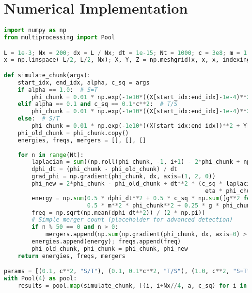 \documentclass{article}
\begin{document}
\section{Numerical Implementation}
\begin{lstlisting}[language=Python, caption=Ehokolon Consciousness Simulation, label=lst:consciousness]
import numpy as np
from multiprocessing import Pool

L = 1e-3; Nx = 200; dx = L / Nx; dt = 1e-15; Nt = 1000; c = 3e8; m = 1.0; g = 0.1; eta = 0.01; k = 0.01
x = np.linspace(-L/2, L/2, Nx); X, Y, Z = np.meshgrid(x, x, x, indexing='ij')

def simulate_chunk(args):
    start_idx, end_idx, alpha, c_sq = args
    if alpha == 1.0:  # S=T
        phi_chunk = 0.01 * np.exp(-1e10*((X[start_idx:end_idx]-1e-4)**2 + Y[start_idx:end_idx]**2 + Z[start_idx:end_idx]**2)) * np.cos(1e12 * X[start_idx:end_idx])
    elif alpha == 0.1 and c_sq == 0.1*c**2:  # T/S
        phi_chunk = 0.01 * np.exp(-1e10*((X[start_idx:end_idx]-1e-4)**2 + Y[start_idx:end_idx]**2 + Z[start_idx:end_idx]**2)) * np.cos(1e10 * X[start_idx:end_idx])
    else:  # S/T
        phi_chunk = 0.01 * np.exp(-1e10*((X[start_idx:end_idx])**2 + Y[start_idx:end_idx]**2 + Z[start_idx:end_idx]**2))
    phi_old_chunk = phi_chunk.copy()
    energies, freqs, mergers = [], [], []
    
    for n in range(Nt):
        laplacian = sum((np.roll(phi_chunk, -1, i+1) - 2*phi_chunk + np.roll(phi_chunk, 1, i+1)) / dx**2 for i in range(2))
        dphi_dt = (phi_chunk - phi_old_chunk) / dt
        grad_phi = np.gradient(phi_chunk, dx, axis=(1, 2, 0))
        phi_new = 2*phi_chunk - phi_old_chunk + dt**2 * (c_sq * laplacian - m**2 * phi_chunk - g * phi_chunk**3 - 
                                                          eta * phi_chunk**5 + 8 * np.pi * 6.674e-11 * k * phi_chunk**2)
        energy = np.sum(0.5 * dphi_dt**2 + 0.5 * c_sq * np.sum([g**2 for g in grad_phi], 0) + 
                        0.5 * m**2 * phi_chunk**2 + 0.25 * g * phi_chunk**4 + 0.1667 * eta * phi_chunk**6) * dx**3
        freq = np.sqrt(np.mean(dphi_dt**2)) / (2 * np.pi))
        # Simple merger count (placeholder for advanced detection)
        if n % 50 == 0 and n > 0:
            mergers.append(np.sum(np.gradient(phi_chunk, dx, axis=0) > 0.1))  # Merger proxy
        energies.append(energy); freqs.append(freq)
        phi_old_chunk, phi_chunk = phi_chunk, phi_new
    return energies, freqs, mergers

params = [(0.1, c**2, "S/T"), (0.1, 0.1*c**2, "T/S"), (1.0, c**2, "S=T")]
with Pool(4) as pool:
    results = pool.map(simulate_chunk, [(i, i+Nx//4, a, c_sq) for i in range(0, Nx, Nx//4) for a, c_sq, _ in params])
\end{lstlisting}
\end{document}

